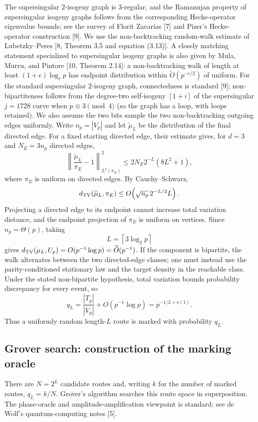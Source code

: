\documentclass[10pt,a4paper]{article}
\begin{document}
The supersingular $2$-isogeny graph is $3$-regular, and the
Ramanujan property of supersingular isogeny graphs follows from
the corresponding Hecke-operator eigenvalue bounds; see the survey
of Florit Zacar\'ias [7] and Pizer's Hecke-operator construction [9].
We use the non-backtracking random-walk estimate of Lubetzky--Peres
[8, Theorem 3.5 and equation (3.13)]. A closely matching statement
specialized to supersingular isogeny graphs is also given by Mula,
Murru, and Pintore [10, Theorem 2.14]: a non-backtracking walk of
length at least $(1+\epsilon)\log_\ell p$ has endpoint distribution
within $\widetilde O(p^{-\epsilon/2})$ of uniform. For the standard supersingular $2$-isogeny graph, connectedness is standard
[9]; non-bipartiteness follows from the degree-two self-isogeny $[1+i]$ of
the supersingular $j=1728$ curve when $p\equiv3\pmod4$ (so the graph has a
loop, with loops retained). We also assume the two bits sample the two
non-backtracking outgoing edges uniformly. Write $n_p=|V_p|$ and let
$\widetilde\mu_L$ be the distribution of the final directed edge.
For a fixed starting directed edge, their estimate gives, for
$d=3$ and $N_E=3n_p$ directed edges,
\[
\left\|\frac{\widetilde\mu_L}{\pi_E}-1\right\|_{L^2(\pi_E)}^2
\le 2N_E2^{-L}(8L^2+1),
\]
where $\pi_E$ is uniform on directed edges. By
Cauchy--Schwarz,
\[
d_{\rm TV}(\widetilde\mu_L,\pi_E)
\le O\!\left(\sqrt{n_p}\,2^{-L/2}L\right).
\]
Projecting a directed edge to its endpoint cannot increase total
variation distance, and the endpoint projection of $\pi_E$ is
uniform on vertices. Since $n_p=\Theta(p)$, taking
\[
L=\left\lceil3\log_2p\right\rceil
\]
gives $d_{\rm TV}(\mu_L,U_p)=O(p^{-1}\log p)=\widetilde O(p^{-1})$.
If the component is bipartite, the walk alternates between the
two directed-edge classes; one must instead use the parity-conditioned
stationary law and the target density in the reachable class.
Under the stated non-bipartite hypothesis, total variation bounds
probability discrepancy for every event, so
\[
q_L=\frac{|T_p|}{|V_p|}+O(p^{-1}\log p)
     =\boxed{p^{-1/2+o(1)}}.
\]
Thus a uniformly random length-$L$ route is marked with
probability $q_L$.

\subsection*{Grover search: construction of the marking oracle}

There are \(N=2^L\) candidate routes and, writing \(k\) for
the number of marked routes, \(q_L=k/N\). Grover's algorithm
searches this route space in superposition. The phase-oracle and amplitude-amplification viewpoint is standard; see de Wolf's quantum-computing notes [5].
\end{document}
